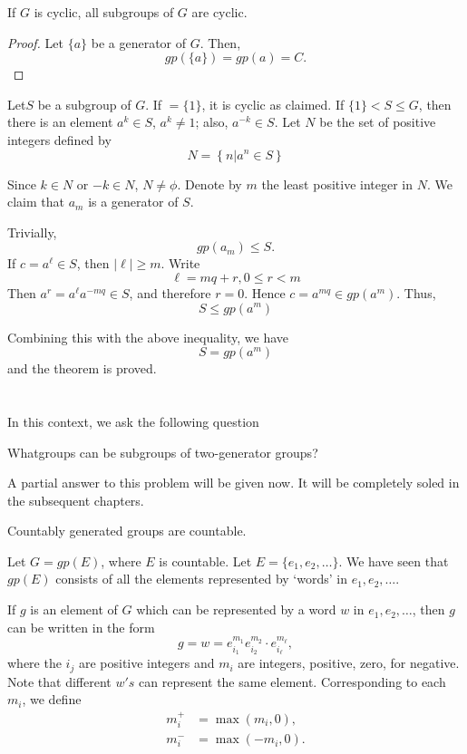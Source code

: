 \begin{theorem}\label{chap2:sec3:thm3}%
  If $G$ is cyclic, all subgroups of $G$ are cyclic.
\end{theorem}

\begin{proof}
  Let $\{ a \}$ be a generator of $G$. Then,
  $$
  gp(\{ a \}) = gp(a) = C.
  $$
\end{proof}

Let\pageoriginale $S$ be a subgroup of $G$. If $= \{ 1 \}$, it is cyclic as
claimed. If $\{ 1 \} < S \leq G$, then there is an element $a^k
\in  S$, $a^k \neq 1$; also, $a^{-k} \in  S$. Let $N$ be
the set of positive integers defined by  
$$
N= \left\{ n \Big| a^n \in  S \right\}
$$

Since $k \in  N$ or $-k \in  N$, $N \neq \phi$. Denote
by $m$ the least positive integer in $N$. We claim that $a_m$ is a
generator of $S$. 

Trivially, 
$$
gp(a_m) \leq S.
$$
If $c = a^\ell \in  S$, then $|\ell |\geq m$. Write
$$
\ell = mq + r, 0 \leq r<m
$$
Then $a^r = a^\ell a^{-mq} \in  S$, and therefore $r=0$. Hence
$c=a^{mq} \in  gp(a^m)$. Thus, 
$$
S \leq gp(a^m)
$$

Combining this with the above inequality, we have 
$$
S= gp(a^m)
$$
and the theorem is proved.

\section{}\label{chap2:sec4}%

In this context, we ask the following question
\begin{prob*}
  What\pageoriginale groups can be subgroups of two-generator groups? 
\end{prob*}
 
A partial answer to this problem will be given now. It will be
completely soled in the subsequent chapters.

\begin{theorem}\label{chap2:sec4:thm4}%
  Countably generated groups are countable.
\end{theorem}

Let $G = gp(E)$, where $E$ is countable. Let $E = \big\{ e_1,
e_2,\ldots \big\}$. We have seen that $gp(E)$ consists of all the
elements represented by `words' in $e_1, e_2, \ldots$. 

If $g$ is an element of $G$ which can be represented by a word $w$ in
$e_1, e_2, \ldots$, then $g$ can be written in the form 
$$
g = w = e^{m_1}_{i_1} e^{m_2}_{i_2} \cdot e^{m_\ell}_{i_\ell},
$$
where the $i_j$ are positive integers and $m_i$ are integers,
positive, zero, for negative. Note that different $w' s$ can represent
the same element. Corresponding to each $m_i$, we define 
\begin{align*}
  m^+_i &= \max (m_i, 0),\\
  m^-_i &= \max (-m_i, 0).
\end{align*}

